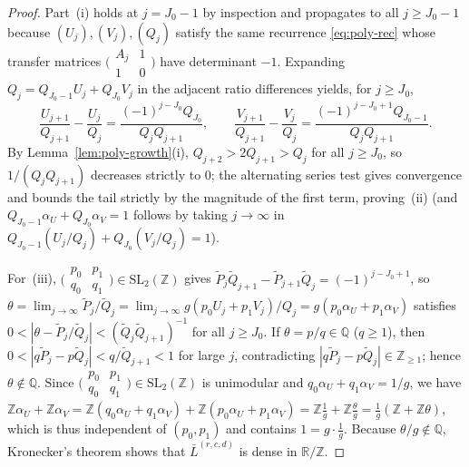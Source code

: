 \documentclass[11pt]{article}
\theoremstyle{definition}
\theoremstyle{remark}
\newcommand{\R}{\mathbb{R}}
\newcommand{\Z}{\mathbb{Z}}
\newcommand{\Q}{\mathbb{Q}}
\begin{document}
\begin{proof}
Part~(i) holds at $j=J_0-1$ by inspection and propagates to all $j\ge J_0-1$
because $(U_j),(V_j),(Q_j)$ satisfy the same recurrence \eqref{eq:poly-rec} whose
transfer matrices $\bigl(\begin{smallmatrix}A_j&1\\1&0\end{smallmatrix}\bigr)$
have determinant $-1$. Expanding $Q_j=Q_{J_0-1}U_j+Q_{J_0}V_j$ in the adjacent
ratio differences yields, for $j\ge J_0$,
\[
\frac{U_{j+1}}{Q_{j+1}}-\frac{U_j}{Q_j}
=\frac{(-1)^{j-J_0}Q_{J_0}}{Q_jQ_{j+1}},\qquad
\frac{V_{j+1}}{Q_{j+1}}-\frac{V_j}{Q_j}
=\frac{(-1)^{j-J_0+1}Q_{J_0-1}}{Q_jQ_{j+1}}.
\]
By Lemma~\ref{lem:poly-growth}(i), $Q_{j+2}>2Q_{j+1}>Q_j$ for all $j\ge J_0$,
so $1/(Q_jQ_{j+1})$ decreases strictly to $0$; the alternating series test
gives convergence and bounds the tail strictly by the magnitude of the first
term, proving~(ii) (and $Q_{J_0-1}\alpha_U+Q_{J_0}\alpha_V=1$ follows by taking
$j\to\infty$ in $Q_{J_0-1}(U_j/Q_j)+Q_{J_0}(V_j/Q_j)=1$).

For~(iii), $\bigl(\begin{smallmatrix}p_0&p_1\\q_0&q_1\end{smallmatrix}\bigr)\in\mathrm{SL}_2(\Z)$
gives $\tilde P_j\tilde Q_{j+1}-\tilde P_{j+1}\tilde Q_j=(-1)^{j-J_0+1}$, so
$\theta=\lim_{j\to\infty}\tilde P_j/\tilde Q_j=\lim_{j\to\infty}g(p_0U_j+p_1V_j)/Q_j=g(p_0\alpha_U+p_1\alpha_V)$
satisfies $0<|\theta-\tilde P_j/\tilde Q_j|<(\tilde Q_j\tilde Q_{j+1})^{-1}$ for
all $j\ge J_0$. If $\theta=p/q\in\Q$ ($q\ge1$), then
$0<|q\tilde P_j-p\tilde Q_j|<q/\tilde Q_{j+1}<1$ for large $j$, contradicting
$|q\tilde P_j-p\tilde Q_j|\in\Z_{\ge1}$; hence $\theta\notin\Q$. Since
$\bigl(\begin{smallmatrix}p_0&p_1\\q_0&q_1\end{smallmatrix}\bigr)\in\mathrm{SL}_2(\Z)$
is unimodular and $q_0\alpha_U+q_1\alpha_V=1/g$, we have
$\Z\alpha_U+\Z\alpha_V=\Z(q_0\alpha_U+q_1\alpha_V)+\Z(p_0\alpha_U+p_1\alpha_V)
=\Z\frac{1}{g}+\Z\frac{\theta}{g}=\frac{1}{g}(\Z+\Z\theta)$, which is thus
independent of $(p_0,p_1)$ and contains $1=g\cdot\frac{1}{g}$. Because
$\theta/g\notin\Q$, Kronecker's theorem shows that $\bar L^{(r,c,d)}$ is dense
in $\R/\Z$.


\end{proof}
\end{document}
